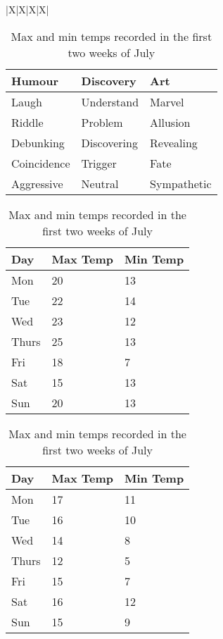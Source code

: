 \begin{table}[h]
  \everyrow{\hrule}
  \tabulinesep{2mm}
  \begin{tabu}{|X|X|X|X|}


\begin{table}[!htb] %
\centering
\begin{tabular}{|l|l|l|}
\hline
\textbf{Humour} & \textbf{Discovery} & \textbf{Art} \\ \hline
Laugh           & Understand         & Marvel       \\ \hline
Riddle          & Problem            & Allusion     \\ \hline
Debunking       & Discovering        & Revealing    \\ \hline
Coincidence     & Trigger            & Fate         \\ \hline
Aggressive      & Neutral            & Sympathetic  \\ \hline
\end{tabular}
\caption[Text for Table of Contents]{Caption text under table}
\end{table}

\begin{table}[h]
    \begin{subtable}[h]{0.45\textwidth}
        \centering
        \begin{tabular}{l | l | l}
        Day & Max Temp & Min Temp \\
        \hline \hline
        Mon & 20 & 13\\
        Tue & 22 & 14\\
        Wed & 23 & 12\\
        Thurs & 25 & 13\\
        Fri & 18 & 7\\
        Sat & 15 & 13\\
        Sun & 20 & 13
        \end{tabular}
        \caption{First Week}
\label{tab:week1}
    \end{subtable}
    \hfill
    \begin{subtable}[h]{0.45\textwidth}
        \centering
        \begin{tabular}{l | l | l}
        Day & Max Temp & Min Temp \\
        \hline \hline
        Mon & 17 & 11\\
        Tue & 16 & 10\\
        Wed & 14 & 8\\
        Thurs & 12 & 5\\
        Fri & 15 & 7\\
        Sat & 16 & 12\\
        Sun & 15 & 9
        \end{tabular}
        \caption{Second Week}
\label{tab:week2}
    \end{subtable}
    \caption{Max and min temps recorded in the first two weeks of July}
\label{tab:temps}
\end{table}


\end{tabu}
\end{table}
